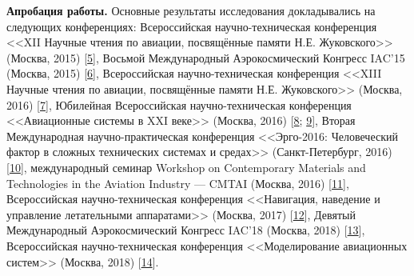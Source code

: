 \textbf{Апробация работы.}
Основные результаты исследования докладывались на следующих конференциях:
Всероссийская научно-техническая конференция <<XII Научные чтения по авиации, посвящённые памяти Н.Е. Жуковского>> (Москва, 2015)
[\hyperref[poliyev2015pca]{5}],
Восьмой Международный Аэрокосмический Конгресс IAC'15 (Москва, 2015)
[\hyperref[poliyev2015split]{6}],
Всероссийская научно-техническая конференция <<XIII Научные чтения по авиации, посвящённые памяти Н.Е. Жуковского>> (Москва, 2016)
[\hyperref[poliyev2016dynamic]{7}],
Юбилейная Всероссийская научно-техническая конференция <<Авиационные системы в XXI веке>> (Москва, 2016)
[\hyperref[poliyev2016split]{8}; \hyperref[poliyev2017split]{9}],
Вторая Международная научно-практическая конференция <<Эрго-2016: Человеческий фактор в сложных технических системах и средах>> (Санкт-Петербург, 2016)
[\hyperref[poliyev2016natural]{10}],
международный семинар Workshop on Contemporary Materials and Technologies in the Aviation Industry --- CMTAI (Москва, 2016)
[\hyperref[poliyev2016pca]{11}],
Всероссийская научно-техническая конференция <<Навигация, наведение и управление летательными аппаратами>> (Москва, 2017)
[\hyperref[poliyev2017bayes]{12}],
Девятый Международный Аэрокосмический Конгресс IAC'18 (Москва, 2018)
[\hyperref[poliyev2018cnn]{13}],
Всероссийская научно-техническая конференция <<Моделирование авиационных систем>> (Москва, 2018)
[\hyperref[poliyev2018cnn2]{14}].


